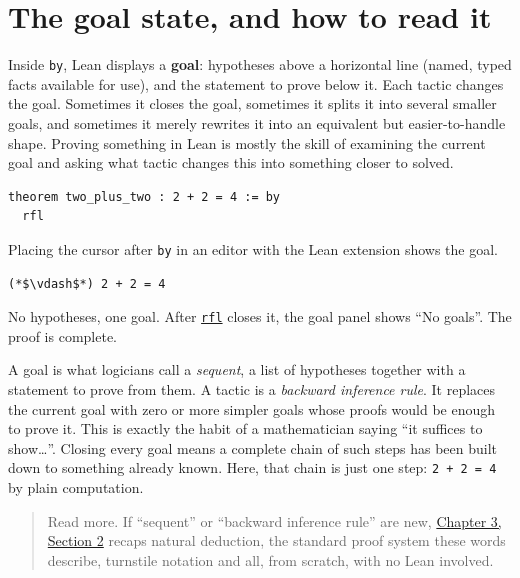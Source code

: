 \section{The goal state, and how to read it}\label{sec:04-tactics:01-goal-state:1}

Inside \texttt{by}, Lean displays a \textbf{goal}: hypotheses above a horizontal line (named, typed facts available for use), and the statement to prove below it. Each tactic changes the goal. Sometimes it closes the goal, sometimes it splits it into several smaller goals, and sometimes it merely rewrites it into an equivalent but easier-to-handle shape. Proving something in Lean is mostly the skill of examining the current goal and asking what tactic changes this into something closer to solved.

\begin{lstlisting}
theorem two_plus_two : 2 + 2 = 4 := by
  rfl
\end{lstlisting}

Placing the cursor after \texttt{by} in an editor with the Lean extension shows the goal.

\begin{lstlisting}
(*$\vdash$*) 2 + 2 = 4
\end{lstlisting}

No hypotheses, one goal. After \href{https://lean-lang.org/doc/reference/latest/Tactic-Proofs/Tactic-Reference/}{\texttt{rfl}} closes it, the goal panel shows ``No goals''. The proof is complete.

\begin{mathreading}

A goal is what logicians call a \emph{sequent}, a list of hypotheses together with a statement to prove from them. A tactic is a \emph{backward inference rule}. It replaces the current goal with zero or more simpler goals whose proofs would be enough to prove it. This is exactly the habit of a mathematician saying ``it suffices to show\ldots{}''. Closing every goal means a complete chain of such steps has been built down to something already known. Here, that chain is just one step: \texttt{2 + 2 = 4} by plain computation.

\end{mathreading}

\begin{quote}
Read more. If ``sequent'' or ``backward inference rule'' are new, \hyperref[sec:03-propositions-and-proofs:02-logic-recap:1]{Chapter 3, Section 2} recaps natural deduction, the standard proof system these words describe, turnstile notation and all, from scratch, with no Lean involved.
\end{quote}


